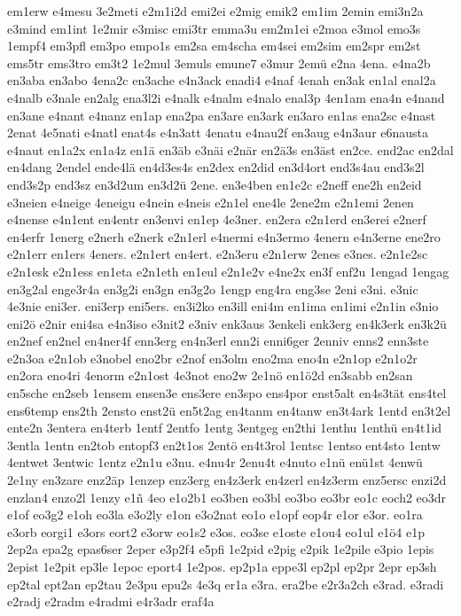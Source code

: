 {em1erw
e4mesu
3e2meti
e2m1i2d
emi2ei
e2mig
emik2
em1im
2emin
emi3n2a
e3mind
em1int
1e2mir
e3misc
emi3tr
emma3u
em2m1ei
e2moa
e3mol
emo3s
1empf4
em3pfl
em3po
empo1s
em2sa
em4scha
em4sei
em2sim
em2spr
em2st
ems5tr
ems3tro
em3t2
1e2mul
3emuls
emune7
e3mur
2emü
e2na
4ena.
e4na2b
en3aba
en3abo
4ena2c
en3ache
e4n3ack
enadi4
e4naf
4enah
en3ak
en1al
enal2a
e4nalb
e3nale
en2alg
ena3l2i
e4nalk
e4nalm
e4nalo
enal3p
4en1am
ena4n
e4nand
en3ane
e4nant
e4nanz
en1ap
ena2pa
en3are
en3ark
en3aro
en1as
ena2sc
e4nast
2enat
4e5nati
e4natl
enat4s
e4n3att
4enatu
e4nau2f
en3aug
e4n3aur
e6nausta
e4naut
en1a2x
en1a4z
en1ä
en3äb
e3näi
e2när
en2ä3s
en3äst
en2ce.
end2ac
en2dal
en4dang
2endel
ende4lä
en4d3es4s
en2dex
en2did
en3d4ort
end3s4au
end3s2l
end3s2p
end3sz
en3d2um
en3d2ü
2ene.
en3e4ben
en1e2c
e2neff
ene2h
en2eid
e3neien
e4neige
4eneigu
e4nein
e4neis
e2n1el
ene4le
2ene2m
e2n1emi
2enen
e4nense
e4n1ent
en4entr
en3envi
en1ep
4e3ner.
en2era
e2n1erd
en3erei
e2nerf
en4erfr
1energ
e2nerh
e2nerk
e2n1erl
e4nermi
e4n3ermo
4enern
e4n3erne
ene2ro
e2n1err
en1ers
4eners.
e2n1ert
en4ert.
e2n3eru
e2n1erw
2enes
e3nes.
e2n1e2sc
e2n1esk
e2n1ess
en1eta
e2n1eth
en1eul
e2n1e2v
e4ne2x
en3f
enf2u
1engad
1engag
en3g2al
enge3r4a
en3g2i
en3gn
en3g2o
1engp
eng4ra
eng3se
2eni
e3ni.
e3nic
4e3nie
eni3er.
eni3erp
eni5ers.
en3i2ko
en3ill
eni4m
en1ima
en1imi
e2n1in
e3nio
eni2ö
e2nir
eni4sa
e4n3iso
e3nit2
e3niv
enk3aus
3enkeli
enk3erg
en4k3erk
en3k2ü
en2nef
en2nel
en4ner4f
enn3erg
en4n3erl
enn2i
enni6ger
2enniv
enns2
enn3ste
e2n3oa
e2n1ob
e3nobel
eno2br
e2nof
en3olm
eno2ma
eno4n
e2n1op
e2n1o2r
en2ora
eno4ri
4enorm
e2n1ost
4e3not
eno2w
2e1nö
en1ö2d
en3sabb
en2san
en5sche
en2seb
1ensem
ensen3e
ens3ere
en3spo
ens4por
enst5alt
en4s3tät
ens4tel
ens6temp
ens2th
2ensto
enst2ü
en5t2ag
en4tanm
en4tanw
en3t4ark
1entd
en3t2el
ente2n
3entera
en4terb
1entf
2entfo
1entg
3entgeg
en2thi
1enthu
1enthü
en4t1id
3entla
1entn
en2tob
entopf3
en2t1os
2entö
en4t3rol
1entsc
1entso
ent4sto
1entw
4entwet
3entwic
1entz
e2n1u
e3nu.
e4nu4r
2enu4t
e4nuto
e1nü
enü1st
4enwü
2e1ny
en3zare
enz2äp
1enzep
enz3erg
en4z3erk
en4zerl
en4z3erm
enz5ersc
enzi2d
enzlan4
enzo2l
1enzy
e1ñ
4eo
e1o2b1
eo3ben
eo3bl
eo3bo
eo3br
eo1c
eoch2
eo3dr
e1of
eo3g2
e1oh
eo3la
e3o2ly
e1on
e3o2nat
eo1o
e1opf
eop4r
e1or
e3or.
eo1ra
e3orb
eorgi1
e3ors
eort2
e3orw
eo1s2
e3os.
eo3se
e1oste
e1ou4
eo1ul
e1ö4
e1p
2ep2a
epa2g
epas6ser
2eper
e3p2f4
e5pfi
1e2pid
e2pig
e2pik
1e2pile
e3pio
1epis
2epist
1e2pit
ep3le
1epoc
eport4
1e2pos.
ep2p1a
eppe3l
ep2pl
ep2pr
2epr
ep3sh
ep2tal
ept2an
ep2tau
2e3pu
epu2s
4e3q
er1a
e3ra.
era2be
e2r3a2ch
e3rad.
e3radi
e2radj
e2radm
e4radmi
e4r3adr
eraf4a
}
